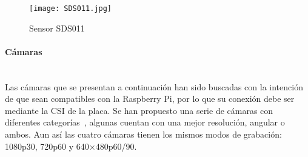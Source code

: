 \begin{figure}[H]
	\caption{Sensor SDS011}
	\texttt{[image: SDS011.jpg]}\label{fig:sds011}
\end{figure}
\endminipage\hfill
{}
\begin{table}[H]
	\centering
	\caption{Especificaciones módulo SDS011}
	\label{tab:sds011}
\end{table}
\endminipage

\paragraph{Cámaras}\mbox{} \\
Las cámaras que se presentan a continuación han sido buscadas con la intención de que sean compatibles con la Raspberry Pi, por lo que su conexión debe ser mediante la CSI de la placa. Se han propuesto una serie de cámaras con diferentes categorías~\cite{cholewiak_raspberry_2017}, algunas cuentan con una mejor resolución, angular o ambos. Aun así las cuatro cámaras tienen los mismos modos de grabación: 1080p30, 720p60 y 640×480p60/90.


